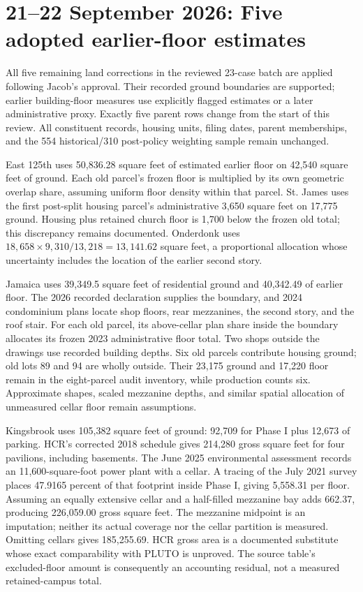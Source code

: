 \section{21--22 September 2026: Five adopted earlier-floor estimates}

All five remaining land corrections in the reviewed 23-case batch are applied
following Jacob's approval. Their recorded ground boundaries are supported;
earlier building-floor measures use explicitly flagged estimates or a later
administrative proxy. Exactly five parent rows change from the start of this
review. All constituent records, housing units, filing dates, parent memberships,
and the 554 historical/310 post-policy weighting sample remain unchanged.

East 125th uses 50,836.28 square feet of estimated earlier floor on 42,540
square feet of ground. Each old parcel's frozen floor is multiplied by its
own geometric overlap share, assuming uniform floor density within that parcel.
St. James uses the first post-split housing parcel's administrative 3,650 square
feet on 17,775 ground. Housing plus retained church floor is 1,700 below the
frozen old total; this discrepancy remains documented. Onderdonk uses
$18,658\times9,310/13,218=13,141.62$ square feet, a proportional allocation
whose uncertainty includes the location of the earlier second story.

Jamaica uses 39,349.5 square feet of residential ground and 40,342.49 of earlier
floor. The 2026 recorded declaration supplies the boundary, and 2024 condominium
plans locate shop floors, rear mezzanines, the second story, and the roof stair.
For each old parcel, its above-cellar plan share inside the boundary allocates
its frozen 2023 administrative floor total. Two shops outside the drawings use
recorded building depths. Six old parcels contribute housing ground; old lots
89 and 94 are wholly outside. Their 23,175 ground and 17,220 floor remain in
the eight-parcel audit inventory, while production counts six. Approximate shapes, scaled mezzanine depths, and
similar spatial allocation of unmeasured cellar floor remain assumptions.

Kingsbrook uses 105,382 square feet of ground: 92,709 for Phase I plus 12,673
of parking. HCR's corrected 2018 schedule gives 214,280 gross square feet for
four pavilions, including basements. The June 2025 environmental assessment
records an 11,600-square-foot power plant with a cellar. A tracing of the July
2021 survey places 47.9165 percent of that footprint inside Phase I, giving
5,558.31 per floor. Assuming an equally extensive cellar and a half-filled
mezzanine bay adds 662.37, producing 226,059.00 gross square feet. The mezzanine
midpoint is an imputation; neither its actual coverage nor the cellar partition
is measured. Omitting cellars gives 185,255.69. HCR gross area is a documented
substitute whose exact comparability with PLUTO is unproved. The source table's
excluded-floor amount is consequently an accounting residual, not a measured
retained-campus total.

